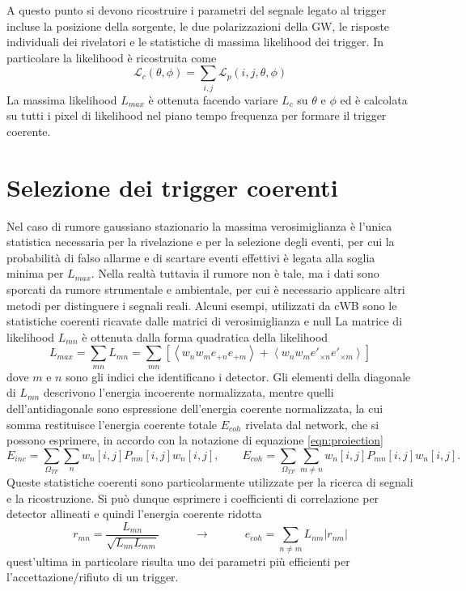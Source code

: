 A questo punto si devono ricostruire i parametri del segnale legato al trigger incluse la posizione della sorgente, le due polarizzazioni della GW, le risposte individuali dei rivelatori e le statistiche di massima likelihood dei trigger. In particolare la likelihood è ricostruita come
\begin{equation}
	\mathcal{L}_c(\theta,\phi) = \sum_{i,j}\mathcal{L}_p(i,j,\theta, \phi)
\end{equation}
La massima likelihood $L_{max}$ è ottenuta facendo variare $L_c$ su $\theta$ e $\phi$ ed è calcolata su tutti i pixel di likelihood nel piano tempo frequenza per formare il trigger coerente\cite{Klimenko_2008}.
\section{Selezione dei trigger coerenti}
Nel caso di rumore gaussiano stazionario la massima verosimiglianza è l'unica statistica necessaria per la rivelazione e per la selezione degli eventi, per cui la probabilità di falso allarme e di scartare eventi effettivi è legata alla soglia minima per $L_{max}$. Nella realtà tuttavia il rumore non è tale, ma i dati sono sporcati da rumore strumentale e ambientale, per cui è necessario applicare altri metodi per distinguere i segnali reali. Alcuni esempi, utilizzati da cWB sono le statistiche coerenti ricavate dalle matrici di verosimiglianza e null
La matrice di likelihood $L_{mn}$ è ottenuta dalla forma quadratica della likelihood
\begin{equation}
	L_{max} = \sum_{mn}L_{mn} = \sum_{mn}\left[\left< w_nw_me_{+n}e_{+m} \right> + \left< w_nw_me'_{\times n}e'_{\times m} \right>\right]
	\label{eqn:likelihood_matrix}
\end{equation}
dove $m\text{ e }n$ sono gli indici che identificano i detector\cite{Klimenko_2008}. Gli elementi della diagonale di $L_{mn}$ descrivono l'energia incoerente normalizzata, mentre quelli dell'antidiagonale sono espressione dell'energia coerente normalizzata, la cui somma restituisce l'energia coerente totale $E_{coh}$ rivelata dal network, che si possono esprimere, in accordo con la notazione di equazione \ref{eqn:proiection}
\begin{equation}
	E_{inc} = \sum_{\Omega_{TF}}\sum_{n}w_n[i,j]P_{mn}[i,j]w_n[i,j],
	\quad\quad
	E_{coh} = \sum_{\Omega_{TF}}\sum_{m\neq n}w_n[i,j]P_{mn}[i,j]w_n[i,j].
\end{equation}
Queste statistiche coerenti sono particolarmente utilizzate per la ricerca di segnali e la ricostruzione\cite{Klimenko_2016}.
Si può dunque esprimere i coefficienti di correlazione per detector allineati e quindi l'energia coerente ridotta
\begin{equation}
	r_{mn} = \frac{L_{mn}}{\sqrt{L_{nn}L_{mm}}} \quad\quad\quad \rightarrow \quad\quad\quad e_{coh}=\sum_{ n\neq m}L_{nm}|r_{nm}|
	\label{eqn:coherent_energy}
\end{equation}
quest'ultima in particolare risulta uno dei parametri più efficienti per l'accettazione/rifiuto di un trigger.

